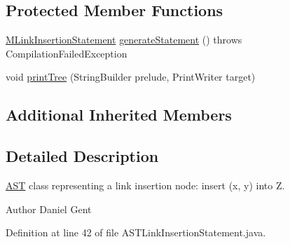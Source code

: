 \subsection*{Protected Member Functions}
\begin{DoxyCompactItemize}
\item 
\hyperlink{classorg_1_1tzi_1_1use_1_1uml_1_1sys_1_1soil_1_1_m_link_insertion_statement}{M\-Link\-Insertion\-Statement} \hyperlink{classorg_1_1tzi_1_1use_1_1parser_1_1soil_1_1ast_1_1_a_s_t_link_insertion_statement_a51203c72e709923c69393e9ec4a203ea}{generate\-Statement} ()  throws Compilation\-Failed\-Exception 
\item 
void \hyperlink{classorg_1_1tzi_1_1use_1_1parser_1_1soil_1_1ast_1_1_a_s_t_link_insertion_statement_a062db58f80d50a462c6f9090c4c5415a}{print\-Tree} (String\-Builder prelude, Print\-Writer target)
\end{DoxyCompactItemize}
\subsection*{Additional Inherited Members}


\subsection{Detailed Description}
\hyperlink{classorg_1_1tzi_1_1use_1_1parser_1_1_a_s_t}{A\-S\-T} class representing a link insertion node\-: {\ttfamily insert (x, y) into Z}.

\begin{DoxyAuthor}{Author}
Daniel Gent 
\end{DoxyAuthor}


Definition at line 42 of file A\-S\-T\-Link\-Insertion\-Statement.\-java.



